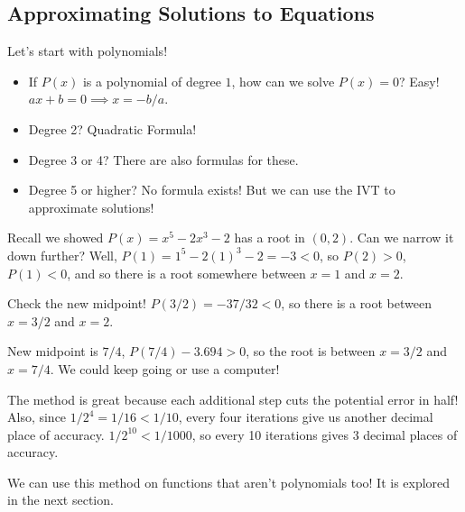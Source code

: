 \subsection{Approximating Solutions to Equations}
Let's start with polynomials!
\begin{itemize}
    \item If $ P(x) $ is a polynomial of degree $ 1 $,
          how can we solve $ P(x)=0 $? Easy! $ ax+b=0\implies x=-b/a $.
    \item Degree 2? Quadratic Formula!
    \item Degree 3 or 4? There are also formulas for these.
    \item Degree 5 or higher? No formula exists! But we can use the IVT to approximate solutions!
\end{itemize}
\begin{Example}{}{}
    Recall we showed $ P(x)=x^5-2x^3-2 $ has a root in $ (0,2) $. Can we narrow it down further?
    Well, $ P(1)=1^5-2(1)^3-2=-3<0 $, so $ P(2)>0 $, $ P(1)<0 $, and so there is a root somewhere between $ x=1 $
    and $ x=2 $.

    Check the new midpoint! $ P(3/2)=-37/32<0 $, so there is a root between $ x=3/2 $ and $ x=2 $.

    New midpoint is $ 7/4 $, $ P(7/4)-3.694>0 $, so the root is between $ x=3/2 $ and $ x=7/4 $.
    We could keep going or use a computer!

    The method is great because each additional step cuts the potential error in half! Also,
    since $ 1/2^4=1/16<1/10 $, every four iterations give us another decimal place of accuracy.
    $ 1/2^{10}<1/1000 $, so every 10 iterations gives 3 decimal places of accuracy.
\end{Example}
\begin{Remark}{}{}
    We can use this method on functions that aren't polynomials too! It is explored in the next section.
\end{Remark}
